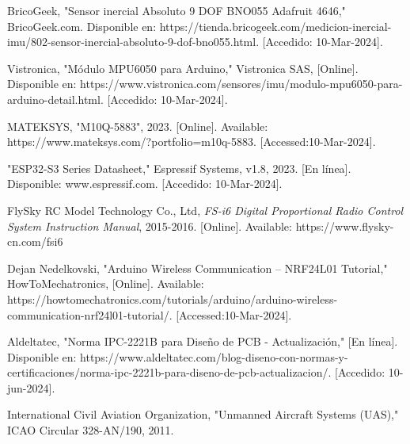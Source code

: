 \begin{thebibliography}{20}
    BricoGeek, "Sensor inercial Absoluto 9 DOF BNO055 Adafruit 4646," BricoGeek.com. Disponible en: https://tienda.bricogeek.com/medicion-inercial-imu/802-sensor-inercial-absoluto-9-dof-bno055.html. [Accedido: 10-Mar-2024].
    
    Vistronica, "Módulo MPU6050 para Arduino," Vistronica SAS, [Online]. Disponible en: https://www.vistronica.com/sensores/imu/modulo-mpu6050-para-arduino-detail.html. [Accedido: 10-Mar-2024].
    
     MATEKSYS, "M10Q-5883", 2023. [Online]. Available: https://www.mateksys.com/?portfolio=m10q-5883. [Accessed:10-Mar-2024].
    
    
    "ESP32-S3 Series Datasheet," Espressif Systems, v1.8, 2023. [En línea]. Disponible: www.espressif.com.  [Accedido: 10-Mar-2024].
    
    FlySky RC Model Technology Co., Ltd, \emph{FS-i6 Digital Proportional Radio Control System Instruction Manual}, 2015-2016. [Online]. Available: https://www.flysky-cn.com/fsi6
    
     Dejan Nedelkovski, "Arduino Wireless Communication – NRF24L01 Tutorial," HowToMechatronics, [Online]. Available: https://howtomechatronics.com/tutorials/arduino/arduino-wireless-communication-nrf24l01-tutorial/. [Accessed:10-Mar-2024].
    
    
    
    
    Aldeltatec, "Norma IPC-2221B para Diseño de PCB - Actualización," [En línea]. Disponible en: https://www.aldeltatec.com/blog-diseno-con-normas-y-certificaciones/norma-ipc-2221b-para-diseno-de-pcb-actualizacion/. [Accedido: 10-jun-2024].
    
     International Civil Aviation Organization, "Unmanned Aircraft Systems (UAS)," ICAO Circular 328-AN/190, 2011.
    
    \end{thebibliography}